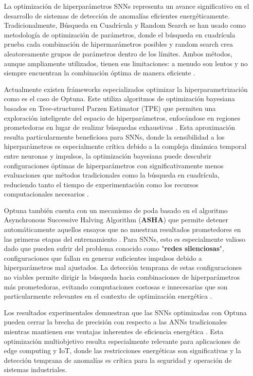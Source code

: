 La optimización de hiperparámetros SNNs representa un avance significativo en el desarrollo de sistemas de detección de anomalías eficientes energéticamente. Tradicionalmente, Búsqueda en Cuadrícula y Random Search se han usado como metodología de optimización de parámetros, donde el búsqueda en cuadrícula prueba cada combinación de hipermarámetros posibles y random search crea aleatoreamente grupos de parámetros dentro de los límites. Ambos métodos, aunque ampliamente utilizados, tienen sus limitaciones: a menudo son lentos y no siempre encuentran la combinación óptima de manera eficiente \cite{noauthor_optuna_nodate}. 

Actualmente existen frámeworks especializados optimizar la hiperparametrización como es el caso de Optuna. Este utiliza algoritmos de optimización bayesiana basados en Tree-structured Parzen Estimator (TPE) que permiten una exploración inteligente del espacio de hiperparámetros, enfocándose en regiones prometedoras en lugar de realizar búsquedas exhaustivas \cite{noauthor_optuna_nodate}. Esta aproximación resulta particularmente beneficiosa para SNNs, donde la sensibilidad a los hiperparámetros es especialmente crítica debido a la compleja dinámica temporal entre neuronas y impulsos, la optimización bayesiana puede descubrir configuraciones óptimas de hiperparámetros con significativamente menos evaluaciones que métodos tradicionales como la búsqueda en cuadrícula, reduciendo tanto el tiempo de experimentación como los recursos computacionales necesarios \cite{firmin_parallel_2024}.

Optuna también cuenta con un mecanismo de poda  basado en el algoritmo Asynchronous Successive Halving Algorithm (\textbf{ASHA}) que permite detener automáticamente aquellos ensayos que no muestran resultados prometedores en las primeras etapas del entrenamiento \cite{noauthor_efficient_2021}. Para SNNs, esto es especialmente valioso dado que pueden sufrir del problema conocido como "\textbf{redes silenciosas}", configuraciones que fallan en generar suficientes impulsos debido a hiperparámetros mal ajustados. La detección temprana de estas configuraciones no viables permite dirigir la búsqueda hacia combinaciones de hiperparámetros más prometedoras, evitando computaciones costosas e innecesarias que son particularmente relevantes en el contexto de optimización energética \cite{firmin_parallel_2024}. 

Los resultados experimentales demuestran que las SNNs optimizadas con Optuna pueden cerrar la brecha de precisión con respecto a las ANNs tradicionales mientras mantienen sus ventajas inherentes de eficiencia energética \cite{parsa_bayesian-based_2019}. Esta optimización multiobjetivo resulta especialmente relevante para aplicaciones de edge computing y IoT, donde las restricciones energéticas son significativas y la detección temprana de anomalías es crítica para la seguridad y operación de sistemas industriales.